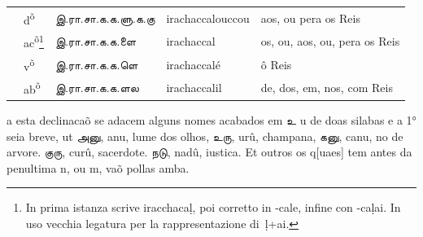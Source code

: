 \documentclass[12pt,a4paper]{scrbook}
\begin{document}
\begin{tabular}{lllll}
            
                 &
                d\textsuperscript{õ} &
                இ.ரா.சா.க.க.ளு.க.கு &
                irachaccalouccou &
                aos, ou pera os Reis \\
    
            
    
            
                 &
                ac\textsuperscript{õ}\footnote{In prima istanza scrive iracchacaḷ, poi corretto in -cale, infine con -caḷai. In uso vecchia legatura per la rappresentazione di ḷ+ai.} &
                இ.ரா.சா.க.க.ளை &
                irachaccal &
                os, ou, aos, ou, pera os Reis \\
    
            
    
            
                 &
                v\textsuperscript{õ} &
                இ.ரா.சா.க.க.ளெ &
                irachaccalé &
                ô Reis \\
    
            
    
            
                 &
                ab\textsuperscript{õ} &
                இ.ரா.சா.க.க.ளல &
                irachaccalil  &
                de, dos, em, nos, com Reis \\
    
            
    
        
\end{tabular}
    
        

a esta declinacaõ se adacem alguns nomes acabados em உ u de doas silabas e a 1° seia breve, ut அனு, anu, lume dos olhos, உரு, urû, champana, கனு, canu, no de arvore. குரு, curû, sacerdote. நடு, nadû, iustica. Et outros os q[uaes] tem antes da penultima n, ou m, vaõ pollas amba.
        
\end{document}
